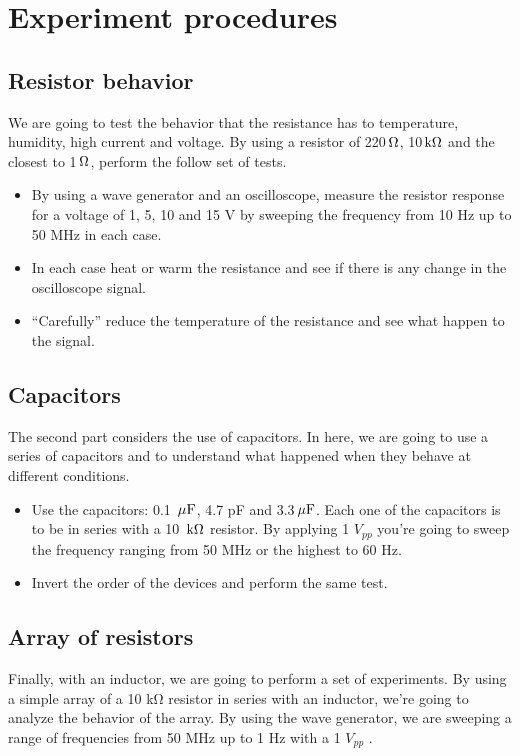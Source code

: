 \documentclass{article}
\newcommand{\unit}[1]{{\rm\,#1}}
\begin{document}
\section{Experiment procedures}

\subsection{Resistor behavior}
We are going to test the behavior that the resistance has to temperature, humidity, high current and voltage. By using a resistor of 220$\unit{\Omega}$, 10$\unit{k\Omega}$ and the closest to 1$\unit{\Omega}$, perform the follow set of tests.
\begin{itemize}
	\item  
	By using a wave generator and an oscilloscope, measure the resistor response for
a voltage of 1, 5, 10 and 15 V by sweeping the frequency from 10 Hz up to 50
MHz in each case.
	\item  
	In each case heat or warm the resistance and see if there is any change in the
oscilloscope signal.
	\item
	``Carefully'' reduce the temperature of the resistance and see what happen to the
signal.
\end{itemize}

\subsection{Capacitors}
The second part considers the use of capacitors. In here, we are going to use a series of
capacitors and to understand what happened when they behave at different conditions.

\begin{itemize}
	\item
	Use the capacitors: 0.1 $\unit{\mu F}$, 4.7 pF and 3.3$\unit{\mu F}$. Each one of the capacitors is to be in series with a 10 $\unit{k\Omega}$ resistor. By applying 1 $V_{pp}$ you’re going to sweep the frequency ranging from 50 MHz or the highest to 60 Hz.
	\item
	Invert the order of the devices and perform the same test.
\end{itemize}

\subsection{Array of resistors}
Finally, with an inductor, we are going to perform a set of experiments. By using
a simple array of a 10 kΩ resistor in series with an inductor, we’re going to analyze
the behavior of the array. By using the wave generator, we are sweeping a range of
frequencies from 50 MHz up to 1 Hz with a 1 $V_{pp}$ .
\end{document}
